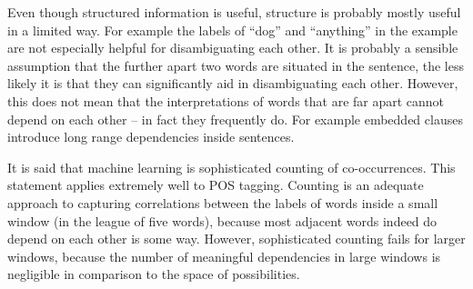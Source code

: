 Even though structured information is useful, structure is probably
mostly useful in a limited way. For example the labels of ``dog'' and
``anything'' in the example are not especially helpful for
disambiguating each other. It is probably a sensible assumption that
the further apart two words are situated in the sentence, the less
likely it is that they can significantly aid in disambiguating each
other. However, this does not mean that the interpretations of words
that are far apart cannot depend on each other -- in fact they
frequently do. For example embedded clauses introduce long range
dependencies inside sentences.

It is said that machine learning is sophisticated counting of
co-occurrences. This statement applies extremely well to POS
tagging. Counting is an adequate approach to capturing correlations
between the labels of words inside a small window (in the league of
five words), because most adjacent words indeed do depend on each
other is some way. However, sophisticated counting fails for larger
windows, because the number of meaningful dependencies in large
windows is negligible in comparison to the space of possibilities.


